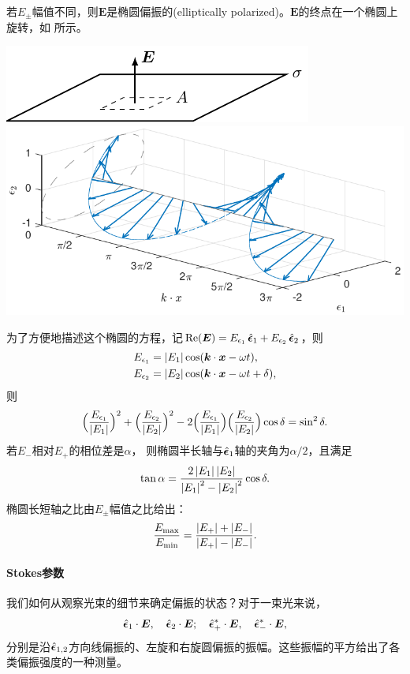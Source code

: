 若$E_\pm$幅值不同，则$\bm E$是椭圆偏振的(elliptically polarized)。$\bm E$的终点在一个椭圆上旋转，如 所示。
\begin{center}
	\includegraphics[page=21]{figures/tikz/layouts.pdf}
    \includegraphics[width=0.5\linewidth]{figures/polarization_elli.pdf}
    \label{fig:elliptical polarization}
\end{center}
为了方便地描述这个椭圆的方程，记$\operatorname{Re}(\bm E)=E_{\epsilon_1}\mathop{}\!\hat{\bm{\epsilon}}_1+E_{\epsilon_2}\mathop{}\!\hat{\bm{\epsilon}}_2$，则
\begin{align*}
    E_{\epsilon_1}&=\left\lvert E_1\right\rvert\cos(\bm k\cdot\bm x-\omega t),\\
    E_{\epsilon_2}&=\left\lvert E_2\right\rvert\cos(\bm k\cdot\bm x-\omega t+\delta),
\end{align*}
则
\[
    \Bigl(\frac{E_{\epsilon_1}}{\left\lvert E_1\right\rvert}\Bigr)^2+\Bigl(\frac{E_{\epsilon_2}}{\left\lvert E_2\right\rvert}\Bigr)^2-2\Bigl(\frac{E_{\epsilon_1}}{\left\lvert E_1\right\rvert}\Bigr)\Bigl(\frac{E_{\epsilon_2}}{\left\lvert E_2\right\rvert}\Bigr)\cos\delta=\sin^2\delta.
\]
若$E_-$相对$E_+$的相位差是$\alpha$，
则椭圆半长轴与$\mathop{}\!\hat{\bm{\epsilon}}_1$轴的夹角为$\alpha/2$，且满足
\[
    \tan\alpha=\frac{2\left\lvert E_1\right\rvert\left\lvert E_2\right\rvert}{\left\lvert E_1\right\rvert^2-\left\lvert E_2\right\rvert^2}\cos\delta.
\]
椭圆长短轴之比由$E_\pm$幅值之比给出：
\[
    \frac{E_{\max}}{E_{\min}}=\frac{\abs{E_+}+\abs{E_-}}{\abs{E_+}-\abs{E_-}}.%
\]

\paragraph{Stokes参数}

我们如何从观察光束的细节来确定偏振的状态？对于一束光来说，
\[
    \mathop{}\!\hat{\bm{\epsilon}}_1\cdot\bm E,\quad\mathop{}\!\hat{\bm{\epsilon}}_2\cdot\bm E;\quad\mathop{}\!\hat{\bm{\epsilon}}_+^\ast\cdot\bm E,\quad\mathop{}\!\hat{\bm{\epsilon}}_-^\ast\cdot\bm E,
\]
分别是沿$\mathop{}\!\hat{\bm{\epsilon}}_{1,2}$方向线偏振的、左旋和右旋圆偏振的振幅。这些振幅的平方给出了各类偏振强度的一种测量。%

